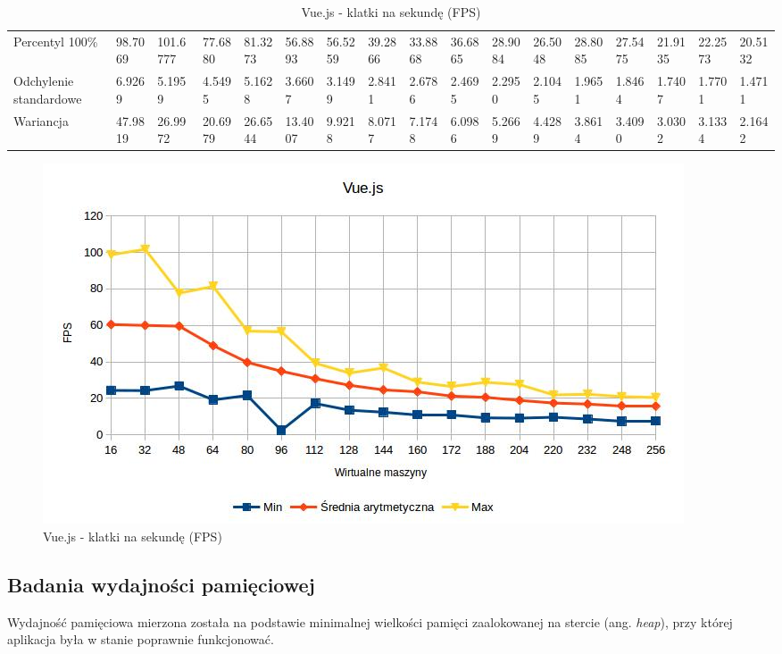 \documentclass[polish, twoside, 12pt]{mwart}
\begin{document}
\begin{table}[]
{\begin{tabular}{@{}lllllllllllllllll@{}}
  Percentyl 100\%        & 98.7069 & 101.6777 & 77.6880 & 81.3273 & 56.8893 & 56.5259 & 39.2866 & 33.8868 & 36.6865 & 28.9084 & 26.5048 & 28.8085 & 27.5475 & 21.9135 & 22.2573 & 20.5132 \\
  Odchylenie standardowe & 6.9269  & 5.1959   & 4.5495  & 5.1628  & 3.6607  & 3.1499  & 2.8411  & 2.6786  & 2.4695  & 2.2950  & 2.1045  & 1.9651  & 1.8464  & 1.7407  & 1.7701  & 1.4711  \\
  Wariancja              & 47.9819 & 26.9972  & 20.6979 & 26.6544 & 13.4007 & 9.9218  & 8.0717  & 7.1748  & 6.0986  & 5.2669  & 4.4289  & 3.8614  & 3.4090  & 3.0302  & 3.1334  & 2.1642  \\ \bottomrule
  \end{tabular}%
  }
  \caption{Vue.js - klatki na sekundę (FPS)}
\end{table}

\begin{figure}[ht]
  \includegraphics[width=\textwidth]{vue-fps.jpg}
	\caption{Vue.js - klatki na sekundę (FPS)}
\end{figure}

\subsection{Badania wydajności pamięciowej}

Wydajność pamięciowa mierzona została na podstawie minimalnej wielkości pamięci zaalokowanej na stercie (ang. \emph{heap}), przy której aplikacja była w stanie poprawnie funkcjonować.

\begin{table}[]
  \centering
  \caption{Angular - minimalny rozmiar sterty}
\end{table}
\end{document}
